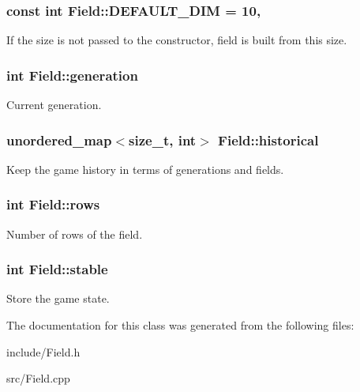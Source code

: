 \subsubsection[{D\+E\+F\+A\+U\+L\+T\+\_\+\+D\+IM}]{\setlength{\rightskip}{0pt plus 5cm}const int Field\+::\+D\+E\+F\+A\+U\+L\+T\+\_\+\+D\+IM = 10\hspace{0.3cm}{\ttfamily [static]}, {\ttfamily [private]}}\hypertarget{classField_add3cd7850a250739b0eb08caf41427da}{}\label{classField_add3cd7850a250739b0eb08caf41427da}
If the size is not passed to the constructor, field is built from this size. 
\subsubsection[{generation}]{\setlength{\rightskip}{0pt plus 5cm}int Field\+::generation\hspace{0.3cm}{\ttfamily [private]}}\hypertarget{classField_abf1358100ec5a7746c0467f25db50eac}{}\label{classField_abf1358100ec5a7746c0467f25db50eac}
Current generation. 
\subsubsection[{historical}]{\setlength{\rightskip}{0pt plus 5cm}unordered\+\_\+map$<$size\+\_\+t, int$>$ Field\+::historical\hspace{0.3cm}{\ttfamily [private]}}\hypertarget{classField_aef4dbb5a7a3eceee6a2fff882ab787df}{}\label{classField_aef4dbb5a7a3eceee6a2fff882ab787df}
Keep the game history in terms of generations and fields. 
\subsubsection[{rows}]{\setlength{\rightskip}{0pt plus 5cm}int Field\+::rows\hspace{0.3cm}{\ttfamily [private]}}\hypertarget{classField_a2a605fd2464725d8bd67b7cd4adfeb38}{}\label{classField_a2a605fd2464725d8bd67b7cd4adfeb38}
Number of rows of the field. 
\subsubsection[{stable}]{\setlength{\rightskip}{0pt plus 5cm}int Field\+::stable\hspace{0.3cm}{\ttfamily [private]}}\hypertarget{classField_a7ffef1a2d4f61e0d7bc628a6183530e1}{}\label{classField_a7ffef1a2d4f61e0d7bc628a6183530e1}
Store the game state. 

The documentation for this class was generated from the following files\+:\begin{DoxyCompactItemize}
\item 
include/Field.\+h\item 
src/Field.\+cpp\end{DoxyCompactItemize}
